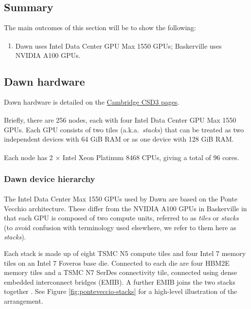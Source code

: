 \subsection{Summary}

The main outcomes of this section will be to show the following:

\begin{enumerate}
    \item Dawn uses Intel\textsuperscript{\tiny\textregistered} Data Center GPU Max 1550 GPUs; Baskerville uses NVIDIA A100 GPUs.
\end{enumerate}

\subsection{Dawn hardware}

Dawn hardware is detailed on the \href{https://docs.hpc.cam.ac.uk/hpc/user-guide/pvc.html#hardware_}{Cambridge CSD3 pages}.

Briefly, there are 256 nodes, each with four Intel\textsuperscript{\tiny\textregistered} Data Center GPU Max 1550 GPUs. Each GPU consists of two tiles (a.k.a.\ \textit{stacks}) that can be treated as two independent devices with 64 GiB RAM or as one device with 128 GiB RAM.

Each node has 2 $\times$ Intel\textsuperscript{\tiny\textregistered} Xeon\textsuperscript{\tiny\textregistered} Platinum 8468 CPUs, giving a total of 96 cores.

\subsubsection{Dawn device hierarchy}
\label{section:devicehierarchy}

The Intel\textsuperscript{\tiny\textregistered} Data Center Max 1550 GPUs used by Dawn are based on the Ponte Vecchio architecture. These differ from the NVIDIA A100 GPUs in Baskerville in that each GPU is composed of two compute units, referred to as \textit{tiles} or \textit{stacks} (to avoid confusion with terminology used elsewhere, we refer to them here as \textit{stacks}).

Each stack is made up of eight TSMC N5 compute tiles and four Intel 7 memory tiles on an Intel 7 Foveros base die. Connected to each die are four HBM2E memory tiles and a TSMC N7 SerDes connectivity tile, connected using dense embedded interconnect bridges (EMIB). A further EMIB joins the two stacks together \cite{ponteveccio_2022}. See Figure \ref{fig:ponteveccio-stacks} for a high-level illustration of the arrangement.

